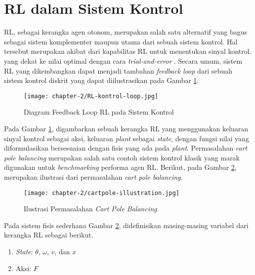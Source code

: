 \section{\acl{RL} dalam Sistem Kontrol}
\label{sec:rl-kontrol}

\ac{RL}, sebagai kerangka agen otonom, merupakan salah satu alternatif yang bagus sebagai sistem komplementer maupun utama dari sebuah sistem kontrol. Hal tersebut merupakan akibat dari kapabilitas \ac{RL} untuk menentukan sinyal kontrol. yang dekat ke nilai optimal dengan cara \textit{trial-and-error} \parencite{vichugov2005application}. Secara umum, sistem RL yang dikembangkan dapat menjadi tambahan \textit{feedback loop} dari sebuah sistem kontrol diskrit yang dapat diilustrasikan pada Gambar \ref{fig:RL-loop-kontrol}.


\begin{figure}[H]
	\centering
	\texttt{[image: chapter-2/RL-kontrol-loop.jpg]}
	\caption{Diagram Feedback Loop \ac{RL} pada Sistem Kontrol \parencite{vichugov2005application}}
	\label{fig:RL-loop-kontrol}
\end{figure}

Pada Gambar \ref{fig:RL-loop-kontrol}, digambarkan sebuah kerangka \ac{RL} yang menggunakan keluaran sinyal kontrol sebagai aksi, keluaran \textit{plant} sebagai \textit{state}, dengan fungsi nilai yang diformulasikan bersesuaian dengan fisis yang ada pada \textit{plant}. Permasalahan \textit{cart pole balancing} \parencite{nagendra2017comparison} merupakan salah satu contoh sistem kontrol klasik yang marak digunakan untuk \textit{benchmarking} performa agen \ac{RL}. Berikut, pada Gambar \ref{fig:cartpole-illustration}, merupakan ilustrasi dari permasalahan \textit{cart pole balancing}.

\begin{figure}[h]
	\centering
	\texttt{[image: chapter-2/cartpole-illustration.jpg]}
	\caption{Ilustrasi Permasalahan \textit{Cart Pole Balancing}}
	\label{fig:cartpole-illustration}
\end{figure}

Pada sistem fisis sederhana Gambar \ref{fig:cartpole-illustration}, didefinisikan masing-masing variabel dari kerangka \ac{RL} sebagai berikut.

\begin{enumerate}
	\item \textit{State}: \(\theta\), \(\omega\), \(v\), dan \(x\)
	\item Aksi: \(F\)
\end{enumerate}

